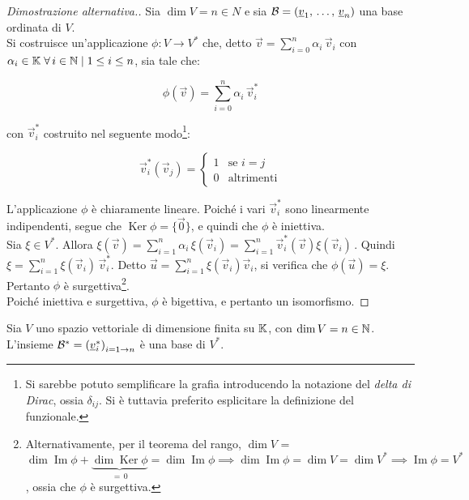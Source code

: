 \documentclass[a4paper]{article}
\newcommand{\dual}[1]{#1^{*}}
\DeclareMathOperator{\Ker}{Ker}
\DeclareMathOperator{\Imm}{Im}
\begin{document}
\begin{proof}[Dimostrazione alternativa.]
Sia $\dim V = n \in N$ e sia $\mathcal{B} = \left(\underline{v}_1, \, \dots, \, \underline{v}_n\right)$ una base ordinata di $V$. \\

Si costruisce un'applicazione $\phi : V \to \dual V$ che,
detto $\vec v = \sum_{i=0}^{n} \alpha_i \, \vec v_i$ con
$\alpha_i \in \mathbb{K} \; \forall \, i \in \mathbb{N} \mid 1 \leq i \leq n$, sia tale che:

\[\phi(\vec v) = \sum_{i=0}^{n} \alpha_i \, \vec v_i^{*}\]

con $\vec v_i^{*}$ costruito nel seguente modo\footnote{Si sarebbe potuto
semplificare la grafia introducendo la notazione del \textit{delta di Dirac}, ossia $\delta_{ij}$. Si è
tuttavia preferito esplicitare la definizione del funzionale.}:

\[\vec v_{i}^*\left(\vec v_j\right) = \begin{cases}1 & \text{se } i = j \\ 0 & \text{altrimenti} \end{cases}\]

L'applicazione $\phi$ è chiaramente lineare. Poiché i vari
$\vec v_i^{*}$ sono linearmente indipendenti, segue che
$\Ker \phi = \{\vec 0\}$, e quindi che $\phi$ è iniettiva. \\

Sia $\xi \in \dual V$. Allora $\xi \left( \vec v \right) =
\sum_{i=1}^{n} \alpha_i \, \xi(\vec v_i) =
\sum_{i=1}^{n} \vec v_i^{*} \left( \vec v \right) \xi(\vec v_i) \, $. Quindi $\xi = \sum_{i=1}^n \xi(\vec v_i) \, \vec v_i^{*}$.
Detto $\vec u = \sum_{i=1}^n \xi \left( \vec v_i \right) \vec v_i$, si verifica che $\phi \left( \vec u \right) = \xi$.
Pertanto $\phi$ è surgettiva\footnote{Alternativamente, per il teorema del rango, $\dim V$ = $\dim \Imm \phi + \underbrace{\dim \Ker \phi}_{=\,0} = \dim \Imm \phi \implies \dim \Imm \phi = \dim V = \dim \dual V \implies \Imm \phi = \dual V$, ossia che $\phi$ è surgettiva.}. \\

Poiché iniettiva e surgettiva, $\phi$ è bigettiva, e pertanto
un isomorfismo.

\end{proof}

\vskip 10pt

\begin{corollary} Sia $V$ uno spazio vettoriale di dimensione
finita su $\mathbb{K}$, con $\dim V = n \in \mathbb{N}$.
L'insieme $\dual \BB = \left( \vec v_i^{*} \right)_{i=1\to n}$ è una base di $\dual V$.
\end{corollary}
\end{document}
